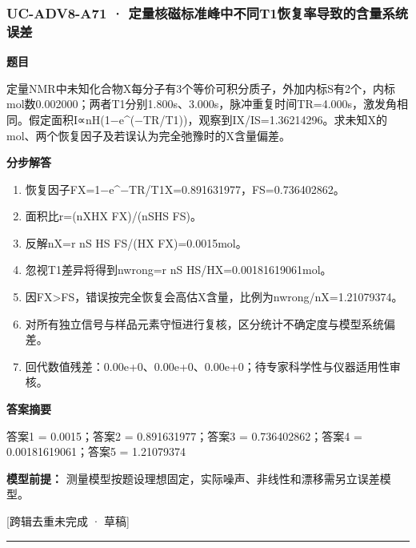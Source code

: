 \documentclass[UTF8,11pt,a4paper]{ctexart}
\begin{document}
\subsubsection*{UC-ADV8-A71 · 定量核磁标准峰中不同T1恢复率导致的含量系统误差}
\noindent\textbf{题目}\par
定量NMR中未知化合物X每分子有3个等价可积分质子，外加内标S有2个，内标mol数0.002000；两者T1分别1.800s、3.000s，脉冲重复时间TR=4.000s，激发角相同。假定面积I∝nH(1−e\textasciicircum{}(−TR/T1))，观察到IX/IS=1.36214296。求未知X的mol、两个恢复因子及若误认为完全弛豫时的X含量偏差。\par
\medskip\noindent\textbf{分步解答}
\begin{enumerate}
\item 恢复因子FX=1−e\textasciicircum{}−TR/T1X=0.891631977，FS=0.736402862。
\item 面积比r=(nXHX FX)/(nSHS FS)。
\item 反解nX=r nS HS FS/(HX FX)=0.0015mol。
\item 忽视T1差异将得到nwrong=r nS HS/HX=0.00181619061mol。
\item 因FX>FS，错误按完全恢复会高估X含量，比例为nwrong/nX=1.21079374。
\item 对所有独立信号与样品元素守恒进行复核，区分统计不确定度与模型系统偏差。
\item 回代数值残差：0.00e+0、0.00e+0、0.00e+0；待专家科学性与仪器适用性审核。
\end{enumerate}
\noindent\textbf{答案摘要}\par
答案1 = 0.0015；答案2 = 0.891631977；答案3 = 0.736402862；答案4 = 0.00181619061；答案5 = 1.21079374\par
\noindent\textbf{模型前提：}
测量模型按题设理想固定，实际噪声、非线性和漂移需另立误差模型。\par
\noindent\textcolor{red!65!black}{[跨辑去重未完成 · 草稿]} \par
\medskip\hrule\medskip
{}
\end{document}

